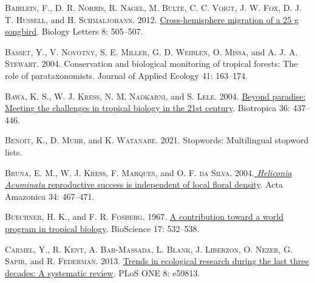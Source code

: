 \documentclass[
  12pt,
  man, donotrepeattitle,floatsintext]{apa6}
\newlength{\cslhangindent}
\newlength{\cslentryspacingunit} %
\newenvironment{CSLReferences}[2] %
 {%
  \setlength{\parindent}{0pt}
  \ifodd #1
  \let\oldpar\par
  \def\par{\hangindent=\cslhangindent\oldpar}
  \fi
  \setlength{\parskip}{#2\cslentryspacingunit}
 }%
 {}
\begin{document}
\begin{CSLReferences}{1}{0}
\leavevmode{}%
\textsc{Bairlein, F.}, \textsc{D. R. Norris}, \textsc{R. Nagel}, \textsc{M. Bulte}, \textsc{C. C. Voigt}, \textsc{J. W. Fox}, \textsc{D. J. T. Hussell}, and \textsc{H. Schmaljohann}. 2012. \href{https://doi.org/10.1098/rsbl.2011.1223}{Cross-hemisphere migration of a 25 g songbird}. Biology Letters 8: 505--507.

\leavevmode{}%
\textsc{Basset, Y.}, \textsc{V. Novotny}, \textsc{S. E. Miller}, \textsc{G. D. Weiblen}, \textsc{O. Missa}, and \textsc{A. J. A. Stewart}. 2004. Conservation and biological monitoring of tropical forests: The role of parataxonomists. Journal of Applied Ecology 41: 163--174.

\leavevmode{}%
\textsc{Bawa, K. S.}, \textsc{W. J. Kress}, \textsc{N. M. Nadkarni}, and \textsc{S. Lele}. 2004. \href{https://doi.org/10.1111/j.1744-7429.2004.tb00341.x}{Beyond paradise: Meeting the challenges in tropical biology in the 21st century}. Biotropica 36: 437--446.

\leavevmode{}%
\textsc{Benoit, K.}, \textsc{D. Muhr}, and \textsc{K. Watanabe}. 2021. Stopwords: {Multilingual} stopword lists.

\leavevmode{}%
\textsc{Bruna, E. M.}, \textsc{W. J. Kress}, \textsc{F. Marques}, and \textsc{O. F. da Silva}. 2004.\href{https://doi.org/10.1590/S0044-59672004000300012}{{ \emph{Heliconia Acuminata} } reproductive success is independent of local floral density}. Acta Amazonica 34: 467--471.

\leavevmode{}%
\textsc{Buechner, H. K.}, and \textsc{F. R. Fosberg}. 1967. \href{https://doi.org/10.2307/1294010}{A contribution toward a world program in tropical biology}. BioScience 17: 532--538.

\leavevmode{}%
\textsc{Carmel, Y.}, \textsc{R. Kent}, \textsc{A. Bar-Massada}, \textsc{L. Blank}, \textsc{J. Liberzon}, \textsc{O. Nezer}, \textsc{G. Sapir}, and \textsc{R. Federman}. 2013. \href{https://doi.org/10.1371/journal.pone.0059813}{Trends in ecological research during the last three decades: A systematic review}. PLoS ONE 8: e59813.


\end{CSLReferences}
\end{document}
